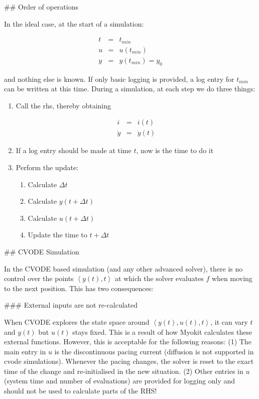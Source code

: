 ## Order of operations

In the ideal case, at the start of a simulation:
\begin{linenomath}
\begin{eqnarray}
t & = & t_{min}\\
u & = & u\left(t_{min}\right)\\
y & = & y\left(t_{min}\right)=y_{0}
\end{eqnarray}
\end{linenomath}
and nothing else is known. If only basic logging is provided, a log
entry for $t_{min}$ can be written at this time. During a simulation,
at each step we do three things:
\begin{enumerate}
\item Call the rhs, thereby obtaining
\begin{linenomath}
\begin{eqnarray*}
i & = & i\left(t\right)\\
\dot{y} & = & \dot{y}\left(t\right)
\end{eqnarray*}
\end{linenomath}

\item If a log entry should be made at time $t$, now is the time to do
it
\item Perform the update:

\begin{enumerate}
\item Calculate $\Delta t$
\item Calculate $y\left(t+\Delta t\right)$
\item Calculate $u\left(t+\Delta t\right)$
\item Update the time to $t+\Delta t$
\end{enumerate}
\end{enumerate}

## CVODE Simulation

In the CVODE based simulation (and any other advanced solver), there
is no control over the points $\left\langle y\left(t\right),t\right\rangle $
at which the solver evaluates $f$ when moving to the next position.
This has two consequences:

### External inputs are not re-calculated

When CVODE explores the state space around $\left\langle y\left(t\right),u\left(t\right),t\right\rangle $, it can vary $t$ and $y\left(t\right)$ but $u\left(t\right)$ stays fixed.
This is a result of how Myokit calculates these external functions.
However, this is acceptable for the following reasons:
(1) The main entry in $u$ is the discontinuous pacing current (diffusion is not supported in cvode simulations).
Whenever the pacing changes, the solver is reset to the exact time of the change and re-initialised in the new situation.
(2) Other entries in $u$ (system time and number of evaluations) are provided for logging only and should not be used to calculate parts of the RHS!

